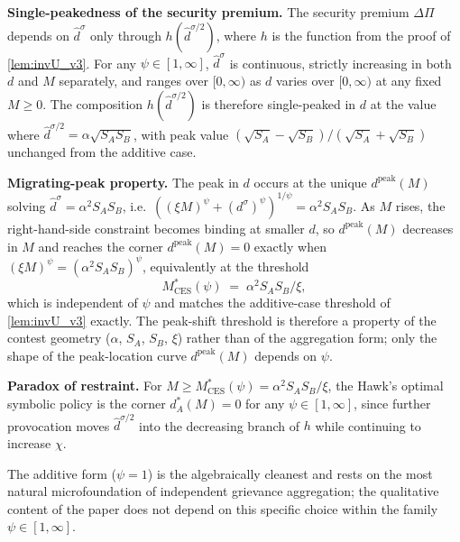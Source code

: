 \documentclass[11pt,twoside]{extarticle}
\begin{document}
\medskip\noindent\textbf{Single-peakedness of the security premium.} The security premium $\Delta\Pi$ depends on $\hat d^\sigma$ only through $h(\hat d^{\sigma/2})$, where $h$ is the function from the proof of \autoref{lem:invU_v3}. For any $\psi\in[1,\infty]$, $\hat d^\sigma$ is continuous, strictly increasing in both $d$ and $M$ separately, and ranges over $[0,\infty)$ as $d$ varies over $[0,\infty)$ at any fixed $M\ge 0$. The composition $h(\hat d^{\sigma/2})$ is therefore single-peaked in $d$ at the value where $\hat d^{\sigma/2}=\alpha\sqrt{S_A S_B}$, with peak value $(\sqrt{S_A}-\sqrt{S_B})/(\sqrt{S_A}+\sqrt{S_B})$ unchanged from the additive case.

\medskip\noindent\textbf{Migrating-peak property.} The peak in $d$ occurs at the unique $d^{\mathrm{peak}}(M)$ solving $\hat d^\sigma=\alpha^2 S_A S_B$, i.e.\ $((\xi M)^\psi+(d^\sigma)^\psi)^{1/\psi}=\alpha^2 S_A S_B$. As $M$ rises, the right-hand-side constraint becomes binding at smaller $d$, so $d^{\mathrm{peak}}(M)$ decreases in $M$ and reaches the corner $d^{\mathrm{peak}}(M)=0$ exactly when $(\xi M)^\psi=(\alpha^2 S_A S_B)^\psi$, equivalently at the threshold
\begin{equation}\label{eq:CES_threshold}
    M^*_{\mathrm{CES}}(\psi)\;=\;\alpha^2 S_A S_B/\xi,
\end{equation}
which is independent of $\psi$ and matches the additive-case threshold of \autoref{lem:invU_v3} exactly. The peak-shift threshold is therefore a property of the contest geometry ($\alpha$, $S_A$, $S_B$, $\xi$) rather than of the aggregation form; only the shape of the peak-location curve $d^{\mathrm{peak}}(M)$ depends on $\psi$.

\medskip\noindent\textbf{Paradox of restraint.} For $M\ge M^*_{\mathrm{CES}}(\psi)=\alpha^2 S_A S_B/\xi$, the Hawk's optimal symbolic policy is the corner $d_A^*(M)=0$ for any $\psi\in[1,\infty]$, since further provocation moves $\hat d^{\sigma/2}$ into the decreasing branch of $h$ while continuing to increase $\chi$.

The additive form ($\psi=1$) is the algebraically cleanest and rests on the most natural microfoundation of independent grievance aggregation; the qualitative content of the paper does not depend on this specific choice within the family $\psi\in[1,\infty]$.




\end{document}
